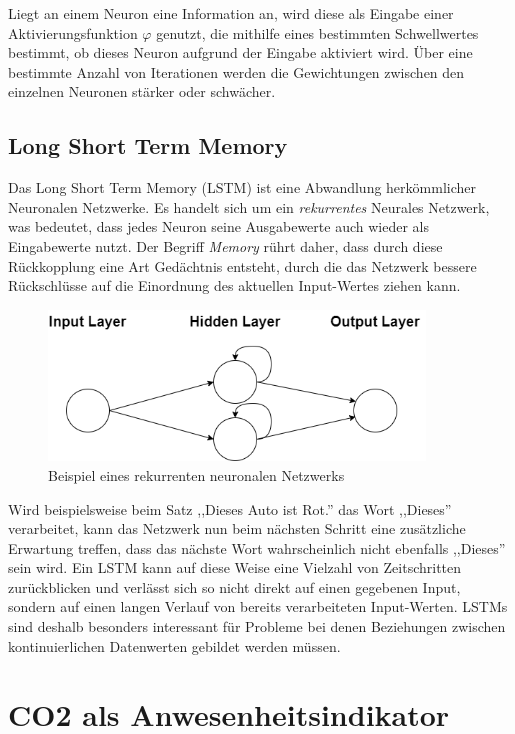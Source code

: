 Liegt an einem Neuron eine Information an, wird diese als Eingabe einer Aktivierungsfunktion $\varphi$ genutzt, 
die mithilfe eines bestimmten Schwellwertes bestimmt, ob dieses Neuron aufgrund der Eingabe aktiviert wird. Über eine 
bestimmte Anzahl von Iterationen werden die Gewichtungen zwischen den einzelnen Neuronen stärker oder schwächer.


\subsection{Long Short Term Memory}
Das Long Short Term Memory (LSTM) ist eine Abwandlung herkömmlicher Neuronalen Netzwerke. Es handelt sich um ein
\textit{rekurrentes} Neurales Netzwerk, was bedeutet, dass jedes Neuron seine Ausgabewerte auch wieder als Eingabewerte
nutzt. Der Begriff \textit{Memory} rührt daher, dass durch diese Rückkopplung eine Art Gedächtnis entsteht, durch 
die das Netzwerk bessere Rückschlüsse auf die Einordnung des aktuellen Input-Wertes ziehen kann.\\

\begin{figure}[h]
    \centering
    \includegraphics[width=10.0cm]{pic/RecurrentNN.png}
    \caption{Beispiel eines rekurrenten neuronalen Netzwerks}
    \label{fig:RecNN}
\end{figure}

Wird beispielsweise beim Satz ,,Dieses Auto ist Rot.'' das Wort ,,Dieses'' verarbeitet, kann das Netzwerk nun beim nächsten
Schritt eine zusätzliche Erwartung treffen, dass das nächste Wort wahrscheinlich nicht ebenfalls ,,Dieses'' sein wird.
Ein LSTM kann auf diese Weise eine Vielzahl von Zeitschritten zurückblicken und verlässt sich so nicht direkt auf 
einen gegebenen Input, sondern auf einen langen Verlauf von bereits verarbeiteten Input-Werten. 
LSTMs sind deshalb besonders interessant für Probleme bei denen Beziehungen zwischen kontinuierlichen 
Datenwerten gebildet werden müssen.\newpage

\section{CO2 als Anwesenheitsindikator}\label{CO2}

